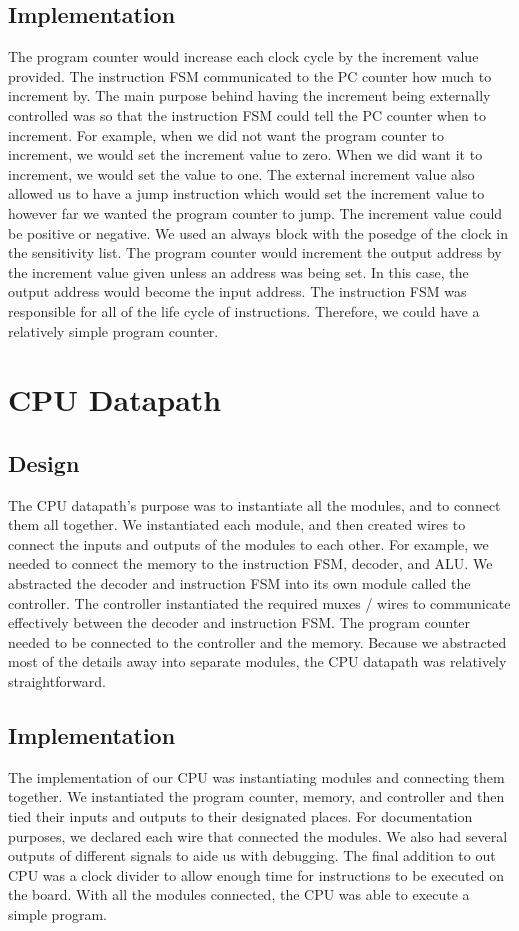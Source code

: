 \documentclass[11pt]{article}
\begin{document}
\subsection{Implementation}
The program counter would increase each clock cycle by the increment value provided. The instruction FSM communicated to the PC counter how much to increment by. The main purpose behind having the increment being externally controlled was so that the instruction FSM could tell the PC counter when to increment. For example, when we did not want the program counter to increment, we would set the increment value to zero. When we did want it to increment, we would set the value to one. The external increment value also allowed us to have a jump instruction which would set the increment value to however far we wanted the program counter to jump. The increment value could be positive or negative. We used an always block with the posedge of the clock in the sensitivity list. The program counter would increment the output address by the increment value given unless an address was being set. In this case, the output address would become the input address. The instruction FSM was responsible for all of the life cycle of instructions. Therefore, we could have a relatively simple program counter.


\section{CPU Datapath}
\subsection{Design}
The CPU datapath’s purpose was to instantiate all the modules, and to connect them all together. We instantiated each module, and then created wires to connect the inputs and outputs of the modules to each other. For example, we needed to connect the memory to the instruction FSM, decoder, and ALU. We abstracted the decoder and instruction FSM into its own module called the controller. The controller instantiated the required muxes / wires to communicate effectively between the decoder and instruction FSM.  The program counter needed to be connected to the controller and the memory. Because we abstracted most of the details away into separate modules, the CPU datapath was relatively straightforward. 

\subsection{Implementation}
The implementation of our CPU was instantiating modules and connecting them together. We instantiated the program counter, memory, and controller and then tied their inputs and outputs to their designated places. For documentation purposes, we declared each wire that connected the modules. We also had several outputs of different signals to aide us with debugging. The final addition to out CPU was a clock divider to allow enough time for instructions to be executed on the board. With all the modules connected, the CPU was able to execute a simple program.
\end{document}
